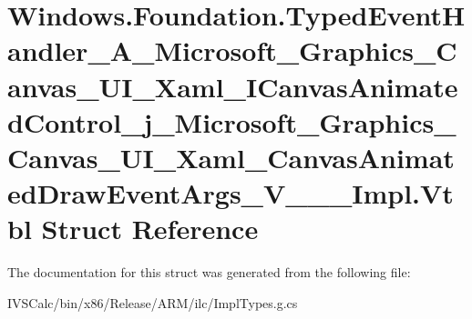\hypertarget{struct_windows_1_1_foundation_1_1_typed_event_handler___a___microsoft___graphics___canvas___u_i_0e1e8a4f8634083cd9a5e9ea147896c8}{}\section{Windows.\+Foundation.\+Typed\+Event\+Handler\+\_\+\+A\+\_\+\+Microsoft\+\_\+\+Graphics\+\_\+\+Canvas\+\_\+\+U\+I\+\_\+\+Xaml\+\_\+\+I\+Canvas\+Animated\+Control\+\_\+j\+\_\+\+Microsoft\+\_\+\+Graphics\+\_\+\+Canvas\+\_\+\+U\+I\+\_\+\+Xaml\+\_\+\+Canvas\+Animated\+Draw\+Event\+Args\+\_\+\+V\+\_\+\+\_\+\+\_\+\+Impl.\+Vtbl Struct Reference}
\label{struct_windows_1_1_foundation_1_1_typed_event_handler___a___microsoft___graphics___canvas___u_i_0e1e8a4f8634083cd9a5e9ea147896c8}


The documentation for this struct was generated from the following file\+:\begin{DoxyCompactItemize}
\item 
I\+V\+S\+Calc/bin/x86/\+Release/\+A\+R\+M/ilc/Impl\+Types.\+g.\+cs\end{DoxyCompactItemize}
